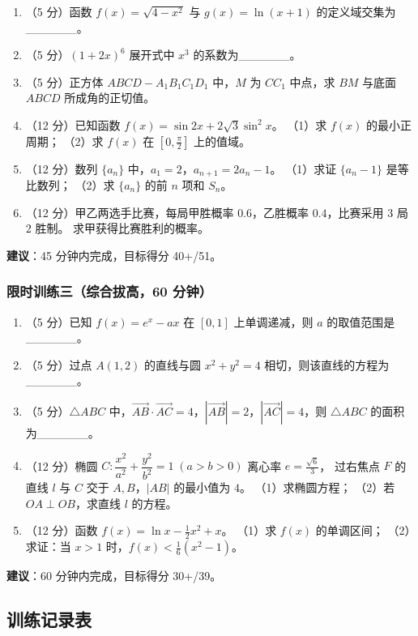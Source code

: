 \begin{enumerate}
  \item（5 分）函数 $f(x)=\sqrt{4-x^2}$ 与 $g(x)=\ln(x+1)$ 的定义域交集为\_\_\_\_\_\_。
  \item（5 分）$(1+2x)^6$ 展开式中 $x^3$ 的系数为\_\_\_\_\_\_。
  \item（5 分）正方体 $ABCD-A_1B_1C_1D_1$ 中，$M$ 为 $CC_1$ 中点，求 $BM$ 与底面 $ABCD$ 所成角的正切值。
  \item（12 分）已知函数 $f(x)=\sin2x+2\sqrt{3}\sin^2x$。
  （1）求 $f(x)$ 的最小正周期；
  （2）求 $f(x)$ 在 $[0,\frac{\pi}{2}]$ 上的值域。
  \item（12 分）数列 $\{a_n\}$ 中，$a_1=2$，$a_{n+1}=2a_n-1$。
  （1）求证 $\{a_n-1\}$ 是等比数列；
  （2）求 $\{a_n\}$ 的前 $n$ 项和 $S_n$。
  \item（12 分）甲乙两选手比赛，每局甲胜概率 $0.6$，乙胜概率 $0.4$，比赛采用 3 局 2 胜制。
  求甲获得比赛胜利的概率。
\end{enumerate}

\textbf{建议}：45 分钟内完成，目标得分 40+/51。

\subsubsection{限时训练三（综合拔高，60 分钟）}

\begin{enumerate}
  \item（5 分）已知 $f(x)=e^x-ax$ 在 $[0,1]$ 上单调递减，则 $a$ 的取值范围是\_\_\_\_\_\_。
  \item（5 分）过点 $A(1,2)$ 的直线与圆 $x^2+y^2=4$ 相切，则该直线的方程为\_\_\_\_\_\_。
  \item（5 分）$\triangle ABC$ 中，$\overrightarrow{AB}\cdot\overrightarrow{AC}=4$，$|\overrightarrow{AB}|=2$，$|\overrightarrow{AC}|=4$，则 $\triangle ABC$ 的面积为\_\_\_\_\_\_。
  \item（12 分）椭圆 $C:\dfrac{x^2}{a^2}+\dfrac{y^2}{b^2}=1\;(a>b>0)$ 离心率 $e=\frac{\sqrt{6}}{3}$，
  过右焦点 $F$ 的直线 $l$ 与 $C$ 交于 $A,B$，$|AB|$ 的最小值为 $4$。
  （1）求椭圆方程；
  （2）若 $OA\perp OB$，求直线 $l$ 的方程。
  \item（12 分）函数 $f(x)=\ln x - \frac12 x^2 + x$。
  （1）求 $f(x)$ 的单调区间；
  （2）求证：当 $x>1$ 时，$f(x) < \frac16(x^2-1)$。
\end{enumerate}

\textbf{建议}：60 分钟内完成，目标得分 30+/39。

\subsection{训练记录表}


